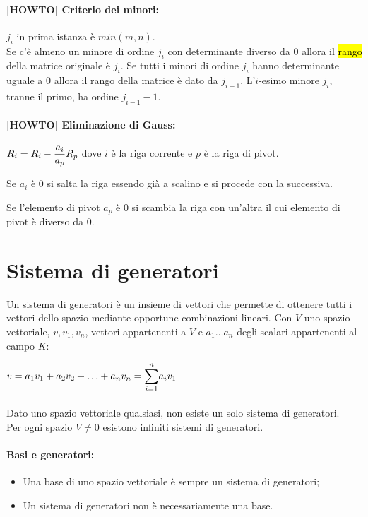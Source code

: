 \documentclass[a4paper]{article}
\begin{document}
        \paragraph{[HOWTO] Criterio dei minori:}
        $j_i$ in prima istanza \`{e} $min(m, n)$.\\
        Se c'\`{e} almeno un minore di ordine $j_i$ con determinante diverso da $0$ allora il \hl{rango} della matrice originale \`{e} $j_i$.
        Se tutti i minori di ordine $j_i$ hanno determinante uguale a $0$ allora il rango della matrice \`{e} dato da $j_{i+1}$.
        L'$i$-esimo minore $j_i$, tranne il primo, ha ordine $j_{i-1} - 1$.

        \paragraph{[HOWTO] Eliminazione di Gauss:}
        $ R_{i} = R_{i} - \mathlarger{\frac{a_{i}}{a_{p}}} R_{p}$ dove $i$ \`{e} la riga corrente e $p$ \`{e} la riga di pivot.

        Se $a_{i}$ \`{e} $0$ si salta la riga essendo gi\`{a} a scalino e si procede con la successiva.

        Se l'elemento di pivot $a_{p}$ \`{e} $0$ si scambia la riga con un'altra il cui elemento di pivot \`{e} diverso da $0$.


        \section*{Sistema di generatori}
        Un sistema di generatori \`{e} un insieme di vettori che permette di ottenere tutti i vettori dello spazio mediante opportune combinazioni lineari.
        Con $V$ uno spazio vettoriale, $v, v_1, v_n$, vettori appartenenti a $V$ e $ a_1 \ldots a_n $ degli scalari appartenenti al campo $K$:

        $v = a_1 v_1 + a_2 v_2 + \ldots + a_n v_n = \mathlarger{\sum}_{i=1}^{n} a_i v_1$

        \paragraph{}
        Dato uno spazio vettoriale qualsiasi, non esiste un solo sistema di generatori.\\Per ogni spazio $V \neq {0}$ esistono infiniti sistemi di generatori.

        \paragraph{Basi e generatori:}
        \begin{itemize}
                \item Una base di uno spazio vettoriale \`{e} sempre un sistema di generatori;
                \item Un sistema di generatori non \`{e} necessariamente una base.
        \end{itemize}
\end{document}
